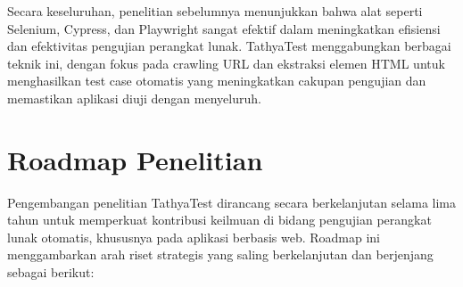 Secara keseluruhan, penelitian sebelumnya menunjukkan bahwa alat seperti Selenium, Cypress, dan Playwright sangat efektif dalam meningkatkan efisiensi dan efektivitas pengujian perangkat lunak. TathyaTest menggabungkan berbagai teknik ini, dengan fokus pada crawling URL dan ekstraksi elemen HTML untuk menghasilkan test case otomatis yang meningkatkan cakupan pengujian dan memastikan aplikasi diuji dengan menyeluruh.

\section{Roadmap Penelitian}\label{roadmap-penelitian}

Pengembangan penelitian TathyaTest dirancang secara berkelanjutan selama lima tahun untuk memperkuat kontribusi keilmuan di bidang pengujian perangkat lunak otomatis, khususnya pada aplikasi berbasis web. Roadmap ini menggambarkan arah riset strategis yang saling berkelanjutan dan berjenjang sebagai berikut:

\vspace{0.3cm}


